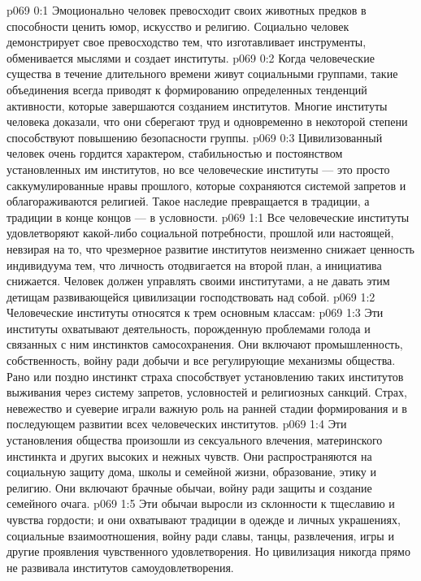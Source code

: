\author{Мелхиседек}
\vs p069 0:1 Эмоционально человек превосходит своих животных предков в способности ценить юмор, искусство и религию. Социально человек демонстрирует свое превосходство тем, что изготавливает инструменты, обменивается мыслями и создает институты.
\vs p069 0:2 Когда человеческие существа в течение длительного времени живут социальными группами, такие объединения всегда приводят к формированию определенных тенденций активности, которые завершаются созданием институтов. Многие институты человека доказали, что они сберегают труд и одновременно в некоторой степени способствуют повышению безопасности группы.
\vs p069 0:3 Цивилизованный человек очень гордится характером, стабильностью и постоянством установленных им институтов, но все человеческие институты --- это просто саккумулированные нравы прошлого, которые сохраняются системой запретов и облагораживаются религией. Такое наследие превращается в традиции, а традиции в конце концов --- в условности.
\vs p069 1:1 Все человеческие институты удовлетворяют какой\hyp{}либо социальной потребности, прошлой или настоящей, невзирая на то, что чрезмерное развитие институтов неизменно снижает ценность индивидуума тем, что личность отодвигается на второй план, а инициатива снижается. Человек должен управлять своими институтами, а не давать этим детищам развивающейся цивилизации господствовать над собой.
\vs p069 1:2 \pc Человеческие институты относятся к трем основным классам:
\vs p069 1:3 \bibnobreakspace {} Эти институты охватывают деятельность, порожденную проблемами голода и связанных с ним инстинктов самосохранения. Они включают промышленность, собственность, войну ради добычи и все регулирующие механизмы общества. Рано или поздно инстинкт страха способствует установлению таких институтов выживания через систему запретов, условностей и религиозных санкций. Страх, невежество и суеверие играли важную роль на ранней стадии формирования и в последующем развитии всех человеческих институтов.
\vs p069 1:4 \pc {}\bibnobreakspace {} Эти установления общества произошли из сексуального влечения, материнского инстинкта и других высоких и нежных чувств. Они распространяются на социальную защиту дома, школы и семейной жизни, образование, этику и религию. Они включают брачные обычаи, войну ради защиты и создание семейного очага.
\vs p069 1:5 \pc {}\bibnobreakspace {} Эти обычаи выросли из склонности к тщеславию и чувства гордости; и они охватывают традиции в одежде и личных украшениях, социальные взаимоотношения, войну ради славы, танцы, развлечения, игры и другие проявления чувственного удовлетворения. Но цивилизация никогда прямо не развивала институтов самоудовлетворения.
